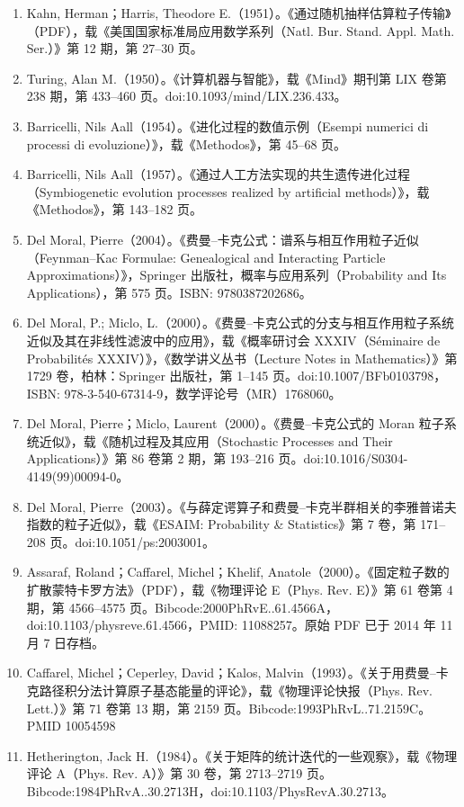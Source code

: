 \begin{enumerate}
\item Kahn, Herman；Harris, Theodore E.（1951）。《通过随机抽样估算粒子传输》（PDF），载《美国国家标准局应用数学系列（Natl. Bur. Stand. Appl. Math. Ser.）》第 12 期，第 27–30 页。
\item Turing, Alan M.（1950）。《计算机器与智能》，载《Mind》期刊第 LIX 卷第 238 期，第 433–460 页。doi:10.1093/mind/LIX.236.433。
\item Barricelli, Nils Aall（1954）。《进化过程的数值示例（Esempi numerici di processi di evoluzione）》，载《Methodos》，第 45–68 页。
\item Barricelli, Nils Aall（1957）。《通过人工方法实现的共生遗传进化过程（Symbiogenetic evolution processes realized by artificial methods）》，载《Methodos》，第 143–182 页。
\item Del Moral, Pierre（2004）。《费曼–卡克公式：谱系与相互作用粒子近似（Feynman–Kac Formulae: Genealogical and Interacting Particle Approximations）》，Springer 出版社，概率与应用系列（Probability and Its Applications），第 575 页。ISBN: 9780387202686。
\item Del Moral, P.; Miclo, L.（2000）。《费曼–卡克公式的分支与相互作用粒子系统近似及其在非线性滤波中的应用》，载《概率研讨会 XXXIV（Séminaire de Probabilités XXXIV）》，《数学讲义丛书（Lecture Notes in Mathematics）》第 1729 卷，柏林：Springer 出版社，第 1–145 页。doi:10.1007/BFb0103798，ISBN: 978-3-540-67314-9，数学评论号（MR）1768060。
\item Del Moral, Pierre；Miclo, Laurent（2000）。《费曼–卡克公式的 Moran 粒子系统近似》，载《随机过程及其应用（Stochastic Processes and Their Applications）》第 86 卷第 2 期，第 193–216 页。doi:10.1016/S0304-4149(99)00094-0。
\item Del Moral, Pierre（2003）。《与薛定谔算子和费曼–卡克半群相关的李雅普诺夫指数的粒子近似》，载《ESAIM: Probability & Statistics》第 7 卷，第 171–208 页。doi:10.1051/ps:2003001。
\item Assaraf, Roland；Caffarel, Michel；Khelif, Anatole（2000）。《固定粒子数的扩散蒙特卡罗方法》（PDF），载《物理评论 E（Phys. Rev. E）》第 61 卷第 4 期，第 4566–4575 页。Bibcode:2000PhRvE..61.4566A，doi:10.1103/physreve.61.4566，PMID: 11088257。原始 PDF 已于 2014 年 11 月 7 日存档。
\item Caffarel, Michel；Ceperley, David；Kalos, Malvin（1993）。《关于用费曼–卡克路径积分法计算原子基态能量的评论》，载《物理评论快报（Phys. Rev. Lett.）》第 71 卷第 13 期，第 2159 页。Bibcode:1993PhRvL..71.2159C。PMID 10054598
\item Hetherington, Jack H.（1984）。《关于矩阵的统计迭代的一些观察》，载《物理评论 A（Phys. Rev. A）》第 30 卷，第 2713–2719 页。Bibcode:1984PhRvA..30.2713H，doi:10.1103/PhysRevA.30.2713。

\end{enumerate}
